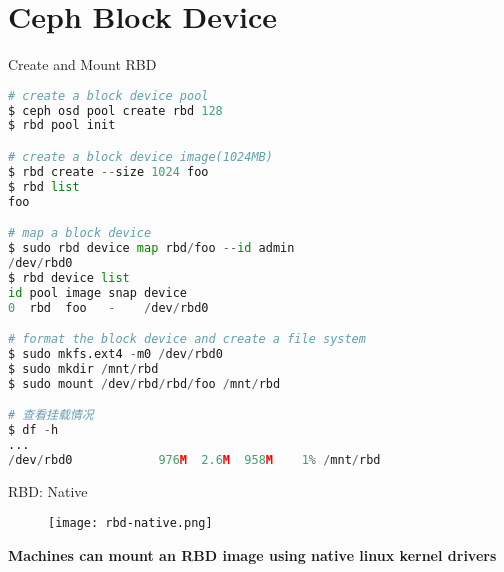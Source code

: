\section{Ceph Block Device}


\begin{frame}[fragile]{Create and Mount RBD}
\begin{lstlisting}[language=python]
# create a block device pool
$ ceph osd pool create rbd 128 
$ rbd pool init

# create a block device image(1024MB)
$ rbd create --size 1024 foo
$ rbd list
foo

# map a block device
$ sudo rbd device map rbd/foo --id admin
/dev/rbd0
$ rbd device list
id pool image snap device
0  rbd  foo   -    /dev/rbd0

# format the block device and create a file system
$ sudo mkfs.ext4 -m0 /dev/rbd0
$ sudo mkdir /mnt/rbd
$ sudo mount /dev/rbd/rbd/foo /mnt/rbd

# 查看挂载情况
$ df -h
...
/dev/rbd0            976M  2.6M  958M    1% /mnt/rbd
\end{lstlisting}
\end{frame}

\begin{frame}{RBD: Native}
    \begin{figure}[htpb]
        \centering
        \texttt{[image: rbd-native.png]}
    \end{figure}
    \textbf{Machines can mount an RBD image using native linux kernel drivers} 
\end{frame}

